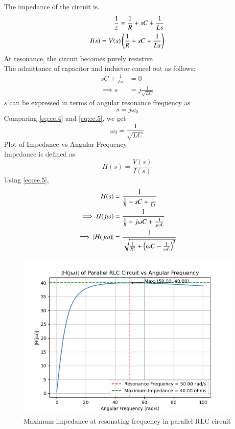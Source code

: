 \documentclass[journal,12pt,twocolumn]{IEEEtran}
\theoremstyle{remark}
\begin{document}

The impedance of the circuit is.
 \begin{align}
     \frac{1}{z}=\frac{1}{R}+sC+\frac{1}{Ls}\\
     I(s)=V(s)\brak{\frac{1}{R}+sC+\frac{1}{Ls}}
     \label{eq:ee.2}
 \end{align}
At resonance, the circuit becomes purely resistive\\
The admittance of capacitor and inductor cancel out as follows:
  \begin{align}
    sC + \frac{1}{Ls} &= 0\\
\implies s &= j\frac{1}{\sqrt{LC}} \label{eq:ee.4}
\end{align}
$s$ can be expressed in terms of angular resonance frequency as
\begin{equation}
    s = j\omega_0 \label{eq:ee.5}
\end{equation}
Comparing \eqref{eq:ee.4} and \eqref{eq:ee.5}, we get
\begin{equation}
    \omega_0 = \frac{1}{\sqrt{LC}}
\end{equation}
Plot of Impedance vs Angular Frequency\\
Impedance is defined as
\begin{equation}
    H(s) = \frac{V(s)}{I(s)}
\end{equation}
Using \eqref{eq:ee.5},
\begin{align}
     H(s) &=\frac{1}{\frac{1}{R} + sC + \frac{1}{Ls}}\\
     \implies H(j\omega) &=\frac{1}{\frac{1}{R} + j\omega C + \frac{1}{j\omega L}}\\
     \implies \left\vert H(j\omega)\right\vert &= \frac{1}{\sqrt{\frac{1}{R^2} +\left(\omega C - \frac{1}{\omega L}\right)^2}}
\end{align}
\begin{figure}[!ht]
    \centering
    \includegraphics[width=1\linewidth]{ncert-physics/12/7/17/figs/m.png}
    \caption{Maximum impedance at resonating frequency in parallel RLC circuit}
\end{figure}
\end{document}
